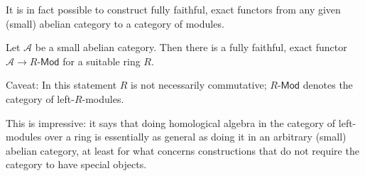 It is in fact possible to construct fully faithful, exact functors from any given (small) abelian category to a category of modules.
\begin{theorem}
Let $\mathcal{A}$ be a small abelian category. Then there is a fully faithful, exact functor $\mathcal{A}\to R$-$\mathsf{Mod}$ for a suitable ring $R$.
\end{theorem}
Caveat: In this statement $R$ is not necessarily commutative; $R$-$\mathsf{Mod}$ denotes
the category of left-$R$-modules.\par
This is impressive: it says that doing homological algebra in the category of left-modules over a ring is essentially as general as doing it in an arbitrary (small) abelian category, at least for what concerns constructions that do not require the category to have special objects.
